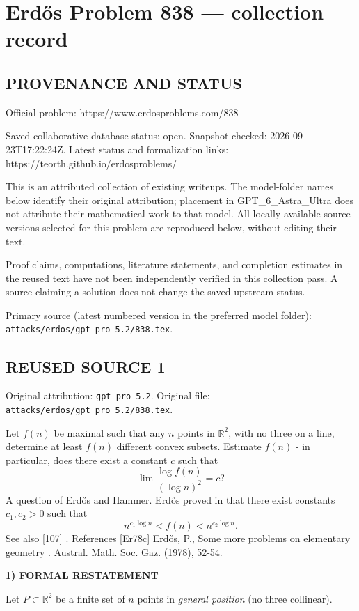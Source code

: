 \section*{Erd\H{o}s Problem 838 --- collection record}

\subsection*{PROVENANCE AND STATUS}
Official problem: https://www.erdosproblems.com/838

Saved collaborative-database status: open.
Snapshot checked: 2026-09-23T17:22:24Z.
Latest status and formalization links: https://teorth.github.io/erdosproblems/

This is an attributed collection of existing writeups. The model-folder names below identify their original attribution; placement in GPT\_6\_Astra\_Ultra does not attribute their mathematical work to that model. All locally available source versions selected for this problem are reproduced below, without editing their text.

Proof claims, computations, literature statements, and completion estimates in the reused text have not been independently verified in this collection pass. A source claiming a solution does not change the saved upstream status.

Primary source (latest numbered version in the preferred model folder): \texttt{attacks/erdos/gpt\_pro\_5.2/838.tex}.

\subsection*{REUSED SOURCE 1}
Original attribution: \texttt{gpt\_pro\_5.2}.
Original file: \texttt{attacks/erdos/gpt\_pro\_5.2/838.tex}.


Let $f(n)$ be maximal such that any $n$ points in $\mathbb{R}^2$, with no three on a line, determine at least $f(n)$ different convex subsets. Estimate $f(n)$ - in particular, does there exist a constant $c$ such that\[\lim \frac{\log f(n)}{(\log n)^2}=c?\] A question of Erd\H{o}s and Hammer. Erd\H{o}s proved in \cite{Er78c} that there exist constants $c_1,c_2>0$ such that\[n^{c_1\log n}<f(n)< n^{c_2\log n}.\]See also [107] . References [Er78c] Erd\H{o}s, P., Some more problems on elementary geometry . Austral. Math. Soc. Gaz. (1978), 52-54.

\medskip
\noindent\textbf{1) FORMAL RESTATEMENT}

Let $P\subset\mathbb R^2$ be a finite set of $n$ points in \emph{general position} (no three collinear).

